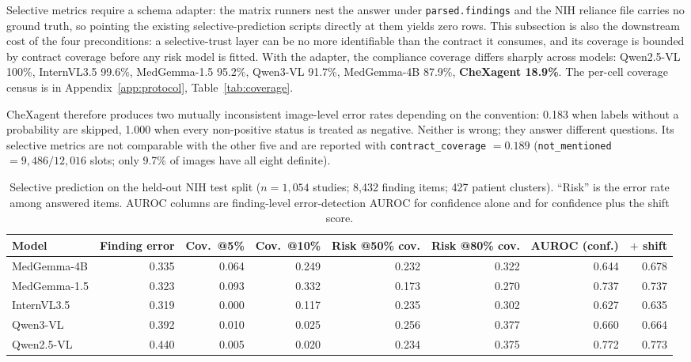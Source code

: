 Selective metrics require a schema adapter: the matrix runners nest the answer under \texttt{parsed.findings} and the NIH reliance file carries no ground truth, so pointing the existing selective-prediction scripts directly at them yields zero rows. This subsection is also the downstream cost of the four preconditions: a selective-trust layer can be no more identifiable than the contract it consumes, and its coverage is bounded by contract coverage before any risk model is fitted. With the adapter, the compliance coverage differs sharply across models: Qwen2.5-VL 100\%, InternVL3.5 99.6\%, MedGemma-1.5 95.2\%, Qwen3-VL 91.7\%, MedGemma-4B 87.9\%, \textbf{CheXagent 18.9\%}. The per-cell coverage census is in Appendix~\ref{app:protocol}, Table~\ref{tab:coverage}.

CheXagent therefore produces two mutually inconsistent image-level error rates depending on the convention: 0.183 when labels without a probability are skipped, 1.000 when every non-positive status is treated as negative. Neither is wrong; they answer different questions. Its selective metrics are not comparable with the other five and are reported with \texttt{contract\_coverage} $=0.189$ (\texttt{not\_mentioned} $=9{,}486/12{,}016$ slots; only 9.7\% of images have all eight definite).

\begin{table}[t]
\centering
\footnotesize
\caption{Selective prediction on the held-out NIH test split ($n=1{,}054$ studies; 8,432 finding items; 427 patient clusters). ``Risk'' is the error rate among answered items. AUROC columns are finding-level error-detection AUROC for confidence alone and for confidence plus the shift score.}
\label{tab:selective}
\begin{tabular}{lrrrrrrr}
\toprule
Model & Finding error & Cov.\ @5\% & Cov.\ @10\% & Risk @50\% cov. & Risk @80\% cov. & AUROC (conf.) & $+$ shift \\
\midrule
MedGemma-4B & 0.335 & 0.064 & 0.249 & 0.232 & 0.322 & 0.644 & 0.678 \\
MedGemma-1.5 & 0.323 & 0.093 & 0.332 & 0.173 & 0.270 & 0.737 & 0.737 \\
InternVL3.5 & 0.319 & 0.000 & 0.117 & 0.235 & 0.302 & 0.627 & 0.635 \\
Qwen3-VL & 0.392 & 0.010 & 0.025 & 0.256 & 0.377 & 0.660 & 0.664 \\
Qwen2.5-VL & 0.440 & 0.005 & 0.020 & 0.234 & 0.375 & 0.772 & 0.773 \\
\bottomrule
\end{tabular}
\end{table}

